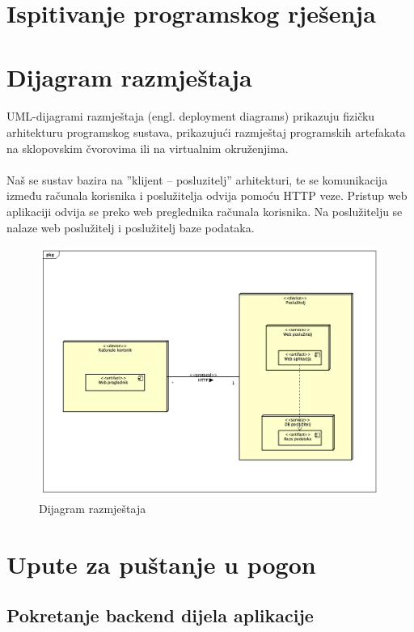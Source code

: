 \section{Ispitivanje programskog rješenja}

\section{Dijagram razmještaja}

\paragraph{}{
UML-dijagrami razmještaja (engl. deployment diagrams) prikazuju fizičku arhitekturu programskog sustava, prikazujući razmještaj programskih artefakata na sklopovskim čvorovima ili na virtualnim okruženjima.
}

\paragraph{}{
Naš se sustav bazira na ”klijent – posluzitelj” arhitekturi, te se komunikacija između računala korisnika i poslužitelja odvija pomoću HTTP veze. Pristup web aplikaciji odvija se preko web preglednika računala korisnika. Na poslužitelju se nalaze web poslužitelj i poslužitelj baze podataka.
}

\begin{figure}[!htb]
	\centering
	\includegraphics[width=1\linewidth]{dijagrami/DijagramRazmjestaja.png}
	\caption{Dijagram razmještaja}
	\label{fig:modelsdiagram}
\end{figure}

\section{Upute za puštanje u pogon}

\subsection{Pokretanje backend dijela aplikacije}

\paragraph{}{
}





\eject